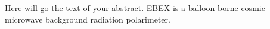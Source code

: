
Here will go the text of your abstract. EBEX is a balloon-borne cosmic microwave background radiation polarimeter. 

